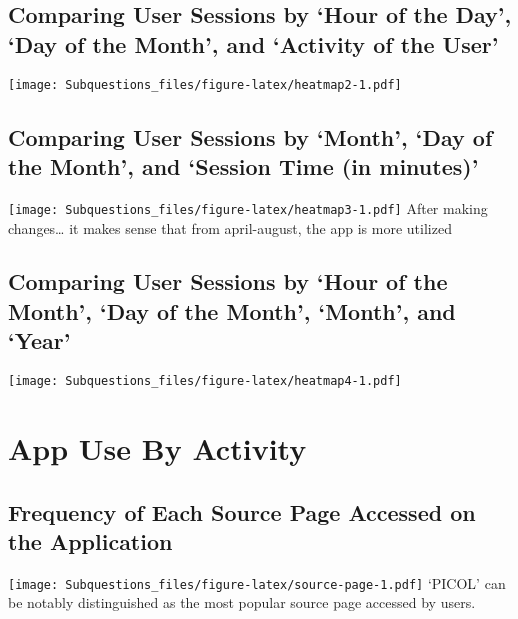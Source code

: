 \documentclass[
]{article}
\begin{document}
\hypertarget{comparing-user-sessions-by-hour-of-the-day-day-of-the-month-and-activity-of-the-user}{%
\subsection{Comparing User Sessions by `Hour of the Day', `Day of the
Month', and `Activity of the
User'}\label{comparing-user-sessions-by-hour-of-the-day-day-of-the-month-and-activity-of-the-user}}

\texttt{[image: Subquestions\_files/figure-latex/heatmap2-1.pdf]}

\hypertarget{comparing-user-sessions-by-month-day-of-the-month-and-session-time-in-minutes}{%
\subsection{Comparing User Sessions by `Month', `Day of the Month', and
`Session Time (in
minutes)'}\label{comparing-user-sessions-by-month-day-of-the-month-and-session-time-in-minutes}}

\texttt{[image: Subquestions\_files/figure-latex/heatmap3-1.pdf]} After
making changes\ldots{} it makes sense that from april-august, the app is
more utilized

\hypertarget{comparing-user-sessions-by-hour-of-the-month-day-of-the-month-month-and-year}{%
\subsection{Comparing User Sessions by `Hour of the Month', `Day of the
Month', `Month', and
`Year'}\label{comparing-user-sessions-by-hour-of-the-month-day-of-the-month-month-and-year}}

\texttt{[image: Subquestions\_files/figure-latex/heatmap4-1.pdf]}

\hypertarget{app-use-by-activity}{%
\section{App Use By Activity}\label{app-use-by-activity}}

\hypertarget{frequency-of-each-source-page-accessed-on-the-application}{%
\subsection{Frequency of Each Source Page Accessed on the
Application}\label{frequency-of-each-source-page-accessed-on-the-application}}

\texttt{[image: Subquestions\_files/figure-latex/source-page-1.pdf]}
`PICOL' can be notably distinguished as the most popular source page
accessed by users.
\end{document}
